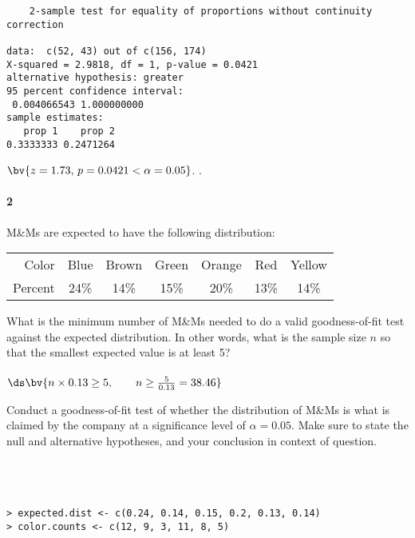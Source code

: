 \documentclass{article}
\begin{document}
\begin{flushleft}
\begin{enumalpha}
\begin{verbatim}
	2-sample test for equality of proportions without continuity correction

data:  c(52, 43) out of c(156, 174)
X-squared = 2.9818, df = 1, p-value = 0.0421
alternative hypothesis: greater
95 percent confidence interval:
 0.004066543 1.000000000
sample estimates:
   prop 1    prop 2 
0.3333333 0.2471264 
\end{verbatim}

$\bv{z = 1.73, \, p = 0.0421 < \alpha = 0.05}$. .\\
\vspace{.5in}
\end{enumalpha}

\newpage
\paragraph{2} M\&Ms are expected to have the following distribution:\\
\smallskip
{\centering
\begin{tabular}{r | c c c c c c }
Color & Blue & Brown & Green & Orange & Red & Yellow\\
Percent & 24\% & 14\% & 15\% & 20\% & 13\% & 14\% 
\end{tabular}
\par} 
\begin{enumalpha}
\item What is the minimum number of M\&Ms needed to do a valid goodness-of-fit test against the expected distribution. In other words, what is the sample size $n$ so that the smallest expected value is at least 5?\\
\medskip
{}\\
\medskip
$\ds\bv{n \times 0.13 \ge 5, \qquad n \ge \frac 5 {0.13} = 38.46}$\\
\medskip
{}
\vspace{.5in}
\item Conduct a goodness-of-fit test of whether the distribution of M\&Ms is what is claimed by the company at a significance level of $\alpha=0.05$. Make sure to state the null and alternative hypotheses, and your conclusion in context of question.\\
\medskip
{}\\
\medskip
{}\\
\bigskip
{}\\
\medskip
\begin{verbatim}
> expected.dist <- c(0.24, 0.14, 0.15, 0.2, 0.13, 0.14)
> color.counts <- c(12, 9, 3, 11, 8, 5)


\end{verbatim}
\end{enumalpha}
\end{flushleft}
\end{document}
